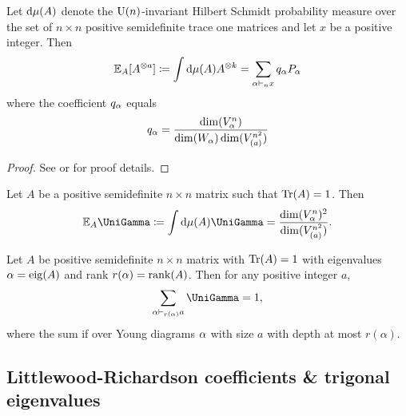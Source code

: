 \documentclass[notitlepage, 10pt]{article}
\begin{document}
\begin{prop}
    \label{prop:HS_measure}
    Let $\mathrm{d} \mu (A)$ denote the $\operatorname{U}(n)$-invariant Hilbert Schmidt probability measure over the set of $n \times n$ positive semidefinite trace one matrices and let $x$ be a positive integer.
    Then
    \begin{equation}
        \label{eq:HS_mean}
        \mathbb E_{A} [A^{\otimes a}] \coloneqq \int \mathrm{d} \mu (A) A^{\otimes k} = \sum_{\alpha \vdash_n x} q_{\alpha} P_{\alpha}
    \end{equation}
    where the coefficient $q_{\alpha}$ equals
    \begin{equation}
        \label{eq:HS_mean_coeff}
        q_{\alpha} = \frac{\dim(V_{\alpha}^{n})}{\dim(W_{\alpha})\dim(V_{(a)}^{n^2})}
    \end{equation}
\end{prop}
\begin{proof}
    See \cite{zyczkowski2001induced} or \cite{walter2014multipartite} for proof details.
\end{proof}
\begin{prop}
    \label{prop:HS_integral_uni}
    Let $A$ be a positive semidefinite $n \times n$ matrix such that $\operatorname{Tr}(A) = 1$.
    Then
    \begin{align}
        \mathbb E_{A} \UniGamma \coloneqq \int \diff \mu(A) \UniGamma = \frac{\dim(V_{\ya}^{n})^2}{\dim(V_{(a)}^{n^2})}.
    \end{align}
\end{prop}
\begin{prop}
    \label{prop:completeness_rel_uni}
    Let $A$ be positive semidefinite $n\times n$ matrix with $\operatorname{Tr}(A) = 1$ with eigenvalues $\alpha = \operatorname{eig}(A)$ and rank $r(\alpha) = \operatorname{rank}(A)$.
    Then for any positive integer $a$,
    \begin{equation}
        \sum_{\ya \vdash_{r(\alpha)} a} \UniGamma = 1,
    \end{equation}
    where the sum if over Young diagrams $\alpha$ with size $a$ with depth at most $r(\alpha)$.
\end{prop}

\subsection{Littlewood-Richardson coefficients \& trigonal eigenvalues}
\label{sec:lr_tri}
\end{document}
